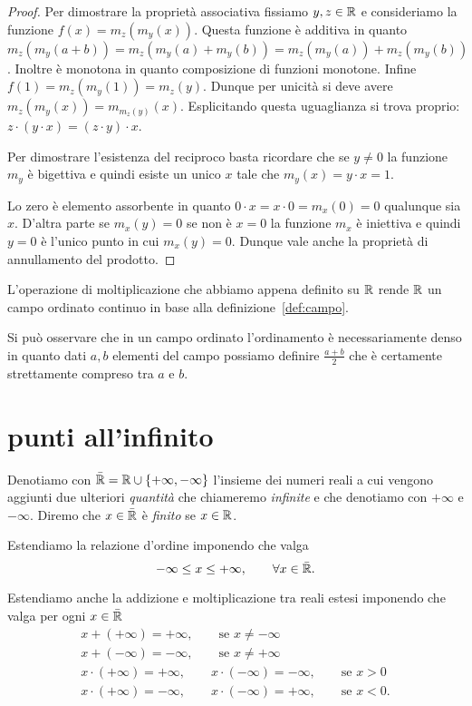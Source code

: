 \begin{proof}
Per dimostrare la proprietà associativa fissiamo $y,z\in {\mathbb R}$
e consideriamo la funzione $f(x) = m_z(m_y(x))$.
Questa funzione è additiva in quanto $m_z(m_y(a+b)) = m_z(m_y(a)+m_y(b))
=m_z(m_y(a)) + m_z(m_y(b))$. 
Inoltre è monotona in quanto composizione di funzioni monotone.
Infine $f(1) = m_z(m_y(1)) = m_z(y)$. 
Dunque per unicità si deve avere $m_z(m_y(x)) = m_{m_z(y)}(x)$.
Esplicitando questa uguaglianza si trova proprio: $z\cdot(y\cdot x) = (z\cdot y)\cdot x$.

Per dimostrare l'esistenza del reciproco basta ricordare che 
se $y\neq 0$ la funzione $m_y$ è bigettiva e quindi 
esiste un unico $x$ tale che $m_y(x)=y\cdot x = 1$.

Lo zero è elemento assorbente in quanto $0 \cdot x = x\cdot 0 = m_x(0)=0$
qualunque sia $x$.
D'altra parte se $m_x(y) = 0$ se non è $x=0$ la funzione $m_x$ è iniettiva 
e quindi $y=0$ è l'unico punto in cui $m_x(y)=0$. 
Dunque vale anche la proprietà di annullamento del prodotto.
\end{proof}

L'operazione di moltiplicazione che abbiamo appena definito su ${\mathbb R}$ 
rende ${\mathbb R}$ un campo ordinato continuo in base alla definizione~\ref{def:campo}.

Si può osservare che in un campo ordinato l'ordinamento 
è necessariamente denso in quanto dati $a,b$ elementi 
del campo possiamo definire $\frac{a+b}{2}$ che è certamente 
strettamente compreso tra $a$ e $b$.

\section{punti all'infinito}
\label{sec:reali_estesi}

\begin{definition}
\mynote{$\bar\RR$}%
\index{$\bar{\RR}$}
Denotiamo con $\bar {{\mathbb R}}={\mathbb R} \cup {\left\{ +\infty, -\infty \right\}}$ l'insieme dei numeri reali
\mynote{$+\infty$, $-\infty$}%
\index{$+\infty$, $-\infty$}
a cui vengono aggiunti due ulteriori \emph{quantità} che chiameremo
\emph{infinite} e che denotiamo con $+\infty$ e $-\infty$.
Diremo che $x\in \bar {{\mathbb R}}$ è \emph{finito} se $x\in {\mathbb R}$.
\end{definition}


Estendiamo la relazione d'ordine imponendo che valga
\[
  -\infty \le x \le +\infty, \qquad \forall x \in \bar{{\mathbb R}}.
\]

Estendiamo anche la addizione e moltiplicazione
tra reali estesi imponendo che valga per ogni $x\in \bar {{\mathbb R}}$
\begin{gather*}
  x + (+\infty) = +\infty, \qquad \text{se $x\neq -\infty$}\\
  x + (-\infty) = -\infty, \qquad \text{se $x\neq +\infty$}\\
  x \cdot (+\infty) = +\infty, \qquad
  x \cdot (-\infty) = -\infty, \qquad \text{se $x>0$} \\
  x \cdot (+\infty) = -\infty, \qquad
  x \cdot (-\infty) = +\infty, \qquad \text{se $x<0$}.
\end{gather*}

